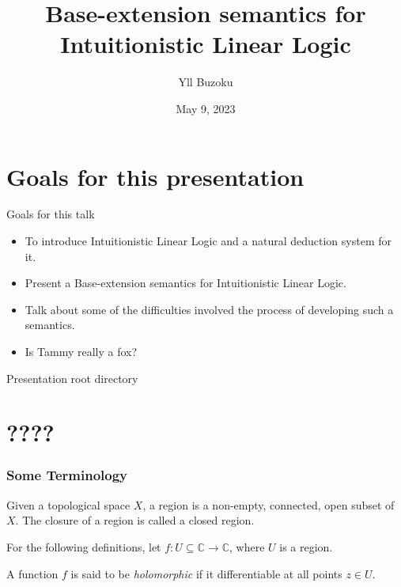 \documentclass{beamer}
\title[P-tS for ILL]{Base-extension semantics for Intuitionistic Linear Logic}
\author{Yll Buzoku}
\institute[UCL]{%
  Department of Computer Science \\ %
  University College London
}
\date{May 9, 2023}
\begin{document}
\begin{frame}
\titlepage
\end{frame}
\section*{Goals for this presentation}
\begin{frame}{Goals for this talk}
\begin{itemize}[label={-}]
\item To introduce Intuitionistic Linear Logic and a natural deduction system for it.
\item Present a Base-extension semantics for Intuitionistic Linear Logic.
\item Talk about some of the difficulties involved the process of developing such a semantics.
\pause
\item Is Tammy really a fox?
\end{itemize}
\end{frame}
\begin{frame}{Presentation root directory}
\tableofcontents
\end{frame}
\section*{????}
\begin{frame}\frametitle{Some Terminology} 
	\begin{defn}[Region]
	  Given a topological space $X$, a region is a non-empty, connected, open subset of $X$. The closure of a region is called a closed region. 
	\end{defn}
	\pause
	For the following definitions, let $f:U\subseteq \mathbb{C} \rightarrow \mathbb{C}$, where $U$ is a region.
	\begin{defn}[Holomorphic]
	A function $f$ is said to be \emph{holomorphic} if it differentiable at all points $z \in U$.
	\end{defn}
\end{frame}
\end{document}
